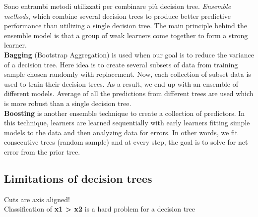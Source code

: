 \begin{tcolorbox}[width=\textwidth,colback={white},title={\textbf{26.} What is the difference between bagging and boosting for decision trees?
		
		
		
		
	},colbacktitle=red,coltitle=black]
	
Sono entrambi metodi utilizzati per combinare più decision tree.
\textit{Ensemble methods}, which combine several decision trees to produce better predictive performance than utilizing a single decision tree. The main principle behind the ensemble model is that a group of weak learners come together to form a strong learner.\\

\textbf{Bagging} (Bootstrap Aggregation) is used when our goal is to reduce the variance of a decision tree. Here idea is to create several subsets of data from training sample chosen randomly with replacement. Now, each collection of subset data is used to train their decision trees. As a result, we end up with an ensemble of different models. Average of all the predictions from different trees are used which is more robust than a single decision tree.\\

\textbf{Boosting} is another ensemble technique to create a collection of predictors. In this technique, learners are learned sequentially with early learners fitting simple models to the data and then analyzing data for errors. In other words, we fit consecutive trees (random sample) and at every step, the goal is to solve for net error from the prior tree.


	
	
\end{tcolorbox}

\subsection{Limitations of decision trees}
Cuts are axis aligned!\\
Classification of \textbf{x1 > x2} is a hard problem for a decision tree


